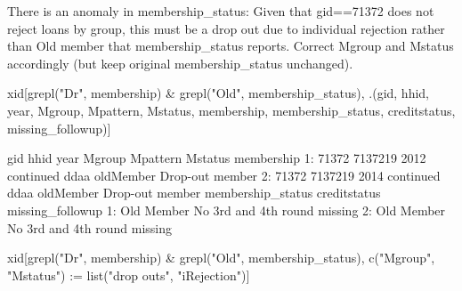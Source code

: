 There is an anomaly in \textsf{membership\_status}: Given that \textsf{gid}==71372 does not reject loans by group, this must be a drop out due to individual rejection rather than Old member that \textsf{membership\_status} reports. Correct \textsf{Mgroup} and \textsf{Mstatus} accordingly (but keep original \textsf{membership\_status} unchanged).
\begin{Schunk}
\begin{Sinput}
xid[grepl("Dr", membership) & grepl("Old", membership_status), 
	.(gid, hhid, year, Mgroup, Mpattern, Mstatus, membership, membership_status, 
	creditstatus, missing_followup)]
\end{Sinput}
\begin{Soutput}
     gid    hhid year    Mgroup Mpattern   Mstatus      membership
1: 71372 7137219 2012 continued     ddaa oldMember Drop-out member
2: 71372 7137219 2014 continued     ddaa oldMember Drop-out member
   membership_status creditstatus          missing_followup
1:        Old Member           No 3rd and 4th round missing
2:        Old Member           No 3rd and 4th round missing
\end{Soutput}
\end{Schunk}

\begin{Schunk}
\begin{Sinput}
xid[grepl("Dr", membership) & grepl("Old", membership_status), 
	c("Mgroup", "Mstatus") := list("drop outs", "iRejection")]
\end{Sinput}
\end{Schunk}

